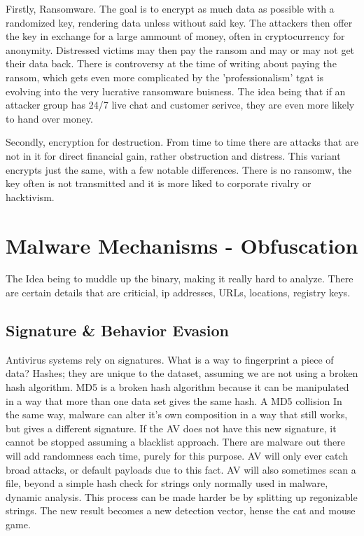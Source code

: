 Firstly, Ransomware. The goal is to encrypt as much data as possible with a randomized key, rendering data unless without said key. The attackers then offer the key in exchange for a large ammount of money, often in cryptocurrency for anonymity. Distressed victims may then pay the ransom and may or may not get their data back.
There is controversy at the time of writing about paying the ransom, which gets even more complicated by the 'professionalism' tgat is evolving into the very lucrative ransomware buisness. The idea being that if an attacker group has 24/7 live chat and customer serivce, they are even more likely to hand over money.

Secondly, encryption for destruction. From time to time there are attacks that are not in it for direct financial gain, rather obstruction and distress. This variant encrypts just the same, with a few notable differences. There is no ransomw, the key often is not transmitted and it is more liked to corporate rivalry or hacktivism.




\chapter{Malware Mechanisms - Obfuscation}
The Idea being to muddle up the binary, making it really hard to analyze. There are certain details that are criticial, ip addresses, URLs, locations, registry keys.

\section{Signature \& Behavior Evasion}
Antivirus systems rely on signatures. What is a way to fingerprint a piece of data? Hashes; they are unique to the dataset, assuming we are not using a broken hash algorithm.
MD5 is a broken hash algorithm because it can be manipulated in a way that more than one data set gives the same hash. A MD5 collision
In the same way, malware can alter it's own composition in a way that still works, but gives a different signature. 
If the AV does not have this new signature, it cannot be stopped assuming a blacklist approach.
There are malware out there will add randomness each time, purely for this purpose. AV will only ever catch broad attacks, or default payloads due to this fact. AV will also sometimes scan a file,
beyond a simple hash check for strings only normally used in malware, dynamic analysis. This process can be made harder be by splitting up regonizable strings. The new result becomes a new detection vector, 
hense the cat and mouse game.

